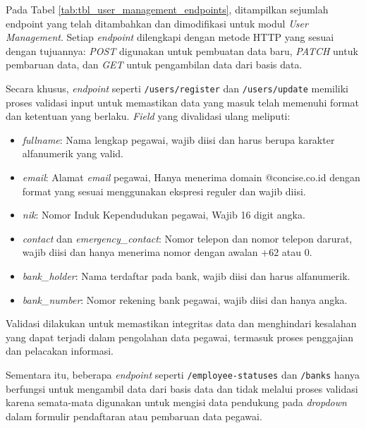 Pada Tabel \ref{tab:tbl_user_management_endpoints}, ditampilkan sejumlah endpoint yang telah ditambahkan dan dimodifikasi untuk modul \textit{User Management}. Setiap \textit{endpoint} dilengkapi dengan metode HTTP yang sesuai dengan tujuannya: \textit{POST} digunakan untuk pembuatan data baru, \textit{PATCH} untuk pembaruan data, dan \textit{GET} untuk pengambilan data dari basis data.

Secara khusus, \textit{endpoint} seperti \texttt{/users/register} dan \texttt{/users/update} memiliki proses validasi input untuk memastikan data yang masuk telah memenuhi format dan ketentuan yang berlaku. \textit{Field} yang divalidasi ulang meliputi:
\begin{itemize}
    \item \textit{fullname}: Nama lengkap pegawai, wajib diisi dan harus berupa karakter alfanumerik yang valid.
    \item \textit{email}: Alamat \textit{email} pegawai, Hanya menerima domain @concise.co.id dengan format yang sesuai menggunakan ekspresi reguler dan wajib diisi.
    \item \textit{nik}: Nomor Induk Kependudukan pegawai, Wajib 16 digit angka.
    \item \textit{contact} dan \textit{emergency\_contact}: Nomor telepon dan nomor telepon darurat, wajib diisi dan hanya menerima nomor dengan awalan +62 atau 0.
    \item \textit{bank\_holder}: Nama terdaftar pada bank, wajib diisi dan harus alfanumerik.
    \item \textit{bank\_number}: Nomor rekening bank pegawai, wajib diisi dan hanya angka.
\end{itemize}

Validasi dilakukan untuk memastikan integritas data dan menghindari kesalahan yang dapat terjadi dalam pengolahan data pegawai, termasuk proses penggajian dan pelacakan informasi.

Sementara itu, beberapa \textit{endpoint} seperti \texttt{/employee-statuses} dan \texttt{/banks} hanya berfungsi untuk mengambil data dari basis data dan tidak melalui proses validasi karena semata-mata digunakan untuk mengisi data pendukung pada \textit{dropdown} dalam formulir pendaftaran atau pembaruan data pegawai.


